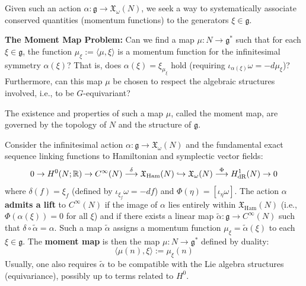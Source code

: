 Given such an action $\alpha: \mathfrak{g}\to \mathfrak{X}_{\omega}(N)$, we seek a way to systematically associate conserved quantities (momentum functions) to the generators $\xi \in \mathfrak{g}$.

\textbf{The Moment Map Problem:} Can we find a map $\mu: N \to \mathfrak{g}^*$ such that for each $\xi \in \mathfrak{g}$, the function $\mu_\xi := \langle \mu, \xi \rangle$ is a momentum function for the infinitesimal symmetry $\alpha(\xi)$? That is, does $\alpha(\xi) = \xi_{\mu_\xi}$ hold (requiring $\iota_{\alpha(\xi)}\omega = -d\mu_\xi$)? Furthermore, can this map $\mu$ be chosen to respect the algebraic structures involved, i.e., to be $G$-equivariant?

The existence and properties of such a map $\mu$, called the moment map, are governed by the topology of $N$ and the structure of $\mathfrak{g}$.

\begin{definition}
\label{def:moment_map_lift}
Consider the infinitesimal action $\alpha: \mathfrak{g}\to \mathfrak{X}_{\omega}(N)$ and the fundamental exact sequence linking functions to Hamiltonian and symplectic vector fields:
\[ 0 \to H^0(N;\mathbb{R}) \to C^\infty(N) \stackrel{\delta}{\longrightarrow} \mathfrak{X}_{\mathrm{Ham}}(N) \hookrightarrow \mathfrak{X}_{\omega}(N) \stackrel{\Phi}{\longrightarrow} H^1_{\text{dR}}(N) \to 0 \]
where $\delta(f) = \xi_f$ (defined by $\iota_{\xi_f}\omega = -df$) and $\Phi(\eta) = [\iota_\eta \omega]$. The action $\alpha$ \textbf{admits a lift} to $C^\infty(N)$ if the image of $\alpha$ lies entirely within $\mathfrak{X}_{\mathrm{Ham}}(N)$ (i.e., $\Phi(\alpha(\xi))=0$ for all $\xi$) and if there exists a linear map $\tilde{\alpha}: \mathfrak{g}\to C^\infty(N)$ such that $\delta \circ \tilde{\alpha} = \alpha$. Such a map $\tilde{\alpha}$ assigns a momentum function $\mu_\xi = \tilde{\alpha}(\xi)$ to each $\xi \in \mathfrak{g}$. The \textbf{moment map} is then the map $\mu: N \to \mathfrak{g}^*$ defined by duality:
\[ \langle \mu(n), \xi \rangle := \mu_\xi(n) \]
Usually, one also requires $\tilde{\alpha}$ to be compatible with the Lie algebra structures (equivariance), possibly up to terms related to $H^0$.
\end{definition}

